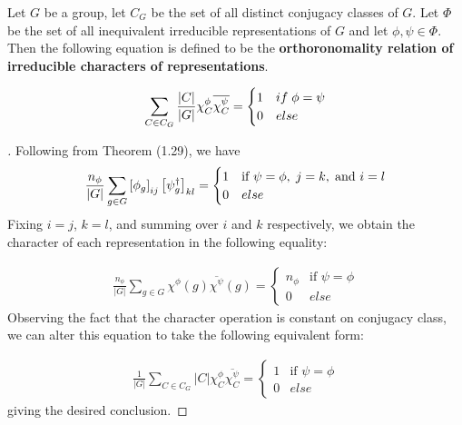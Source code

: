 \begin{theorem}
	Let $G$ be a group, let $C_G$ be the set of all distinct conjugacy classes of $G$. Let $\Phi$ be the set of all inequivalent irreducible representations of $G$ and let $\phi,\psi\in\Phi$. Then the following equation is defined to be the \textbf{orthoronomality relation of irreducible characters of representations}.

$$\sum_{C \in C_G} \frac{|C|}{|G|} \chi^{\phi}_C \overline{\chi^{\psi}_C } = \begin{cases}
																1 & if \hspace{1mm} \phi = \psi \\
																0 & else
															\end{cases}$$
\end{theorem}
\noindent \begin{proof}[\cite{Tung}] Following from Theorem (1.29), we have 
$$\frac{n_\phi}{|G|} \sum_{g\in G} \left[\phi_g \right]_{ij} \left[\psi_g^\dag \right]_{kl} = \begin{cases}
																						1 & \text{if } \psi = \phi,\hspace{1mm} j=k,\hspace{1mm} \text{and } i=l\\
																						0 & else
																					 \end{cases}$$
Fixing $i=j$, $k=l$, and summing over $i$ and $k$ respectively, we obtain the character of each representation in the following equality:

\begin{equation}
	\begin{aligned}
		\frac{n_\phi}{|G|} \sum_{g\in G} \chi^\phi(g) \overline{\chi^\psi}(g) = \begin{cases}
																						n_\phi & \text{if } \psi = \phi \\
																						0 & else
																					 \end{cases}
	\end{aligned}
\end{equation}
Observing the fact that the character operation is constant on conjugacy class, we can alter this equation to take the following equivalent form:

\begin{equation}
	\begin{aligned}
		\frac{1}{|G|} \sum_{C\in C_G} |C| \chi^\phi_C \overline{\chi^\psi_C}= \begin{cases}
																						1 & \text{if } \psi = \phi \\
																						0 & else
																					 \end{cases}
	\end{aligned}
\end{equation}
giving the desired conclusion.  \end{proof}

